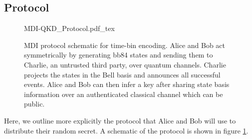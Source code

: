 \subsection{Protocol}

\begin{figure}[tp]
	\centering
	\small
	\def\svgwidth{\textwidth} 
	{MDI-QKD_Protocol.pdf_tex}
	\caption[MDI-QKD time-bin encoded protocol]{\Ac{MDI} protocol schematic for time-bin encoding. Alice and Bob act symmetrically by generating \acs{bb84} states and sending them to Charlie, an untrusted third party, over quantum channels. Charlie projects the states in the Bell basis and announces all successful events. Alice and Bob can then infer a key after sharing state basis information over an authenticated classical channel which can be public.}
	\label{fig:mdi_protocol}
\end{figure}

Here, we outline more explicitly the protocol that Alice and Bob will use to distribute their random secret. A schematic of the protocol is shown in figure \ref{fig:mdi_protocol}. 


